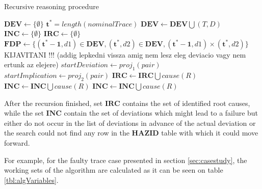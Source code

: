 \documentclass[conference]{IEEEtran}
\begin{document}
\begin{algorithm*}
\caption{Recursive reasoning procedure}
\label{alg:main}
\begin{algorithmic}[1]
\State $\mathbf{DEV} \leftarrow \{ \emptyset \}$
\State $\mathbf{t^*}=length(nominalTrace)$
\State $\mathbf{DEV} \leftarrow \mathbf{DEV} \bigcup (T,D)$
\EndFor
\EndFor
\State $\mathbf{INC} \leftarrow \{ \emptyset \}$
\State $\mathbf{IRC} \leftarrow \{ \emptyset \}$
\State $\mathbf{FDP} \leftarrow \{(\mathbf{t^*-1},d1) \in \mathbf{DEV},(\mathbf{t^*},d2) \in \mathbf{DEV}, (\mathbf{t^*-1},d1) \times (\mathbf{t^*},d2) \}$ KIJAVITANI !!! (addig lepkedni vissza amig nem lesz eleg deviacio vagy nem ertunk az elejere)
  \State $startDeviation \leftarrow proj_1(pair)$
  \State $startImplication \leftarrow proj_2(pair)$
  \State {}
\EndFor
{}
     \State $\mathbf{IRC} \leftarrow \mathbf{IRC} \bigcup cause(R)$
     \State \Return
   \Else
          	\State {}
     \Else
      \State $\mathbf{INC} \leftarrow \mathbf{INC} \bigcup cause(R)$
      \State \Return
     \EndIf
   \EndIf
 \EndFor
\Else
\State $\mathbf{INC} \leftarrow \mathbf{INC} \bigcup cause(R)$
      \State \Return
\EndIf
\EndProcedure
\end{algorithmic}
\end{algorithm*}

After the recursion finished, set $\mathbf{IRC}$ contains the set of identified root causes, while the set
$\mathbf{INC}$ contain the set of deviations which might lead to a failure but either do not occur in the list
of deviations in advance of the actual deviation or the search could not find any row in the $\mathbf{HAZID}$ table with which it could move forward.

For example, for the faulty trace case presented in section \ref{sec:casestudy}, the working sets of the algorithm are calculated as it can be seen on table \ref{tbl:algVariables}.
\end{document}
